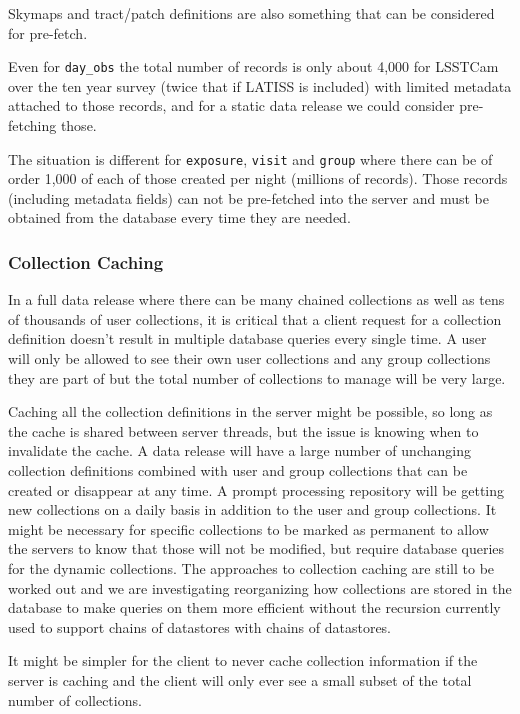 Skymaps and tract/patch definitions are also something that can be considered for pre-fetch.

Even for \texttt{day\_obs} the total number of records is only about 4,000 for LSSTCam over the ten year survey (twice that if LATISS is included) with limited metadata attached to those records, and for a static data release we could consider pre-fetching those.

The situation is different for \texttt{exposure}, \texttt{visit} and \texttt{group} where there can be of order 1,000 of each of those created per night (millions of records).
Those records (including metadata fields) can not be pre-fetched into the server and must be obtained from the database every time they are needed.

\subsubsection{Collection Caching}\label{collection-caching}

In a full data release where there can be many chained collections as well as tens of thousands of user collections, it is critical that a client request for a collection definition doesn't result in multiple database queries every single time.
A user will only be allowed to see their own user collections and any group collections they are part of but the total number of collections to manage will be very large.

Caching all the collection definitions in the server might be possible, so long as the cache is shared between server threads, but the issue is knowing when to invalidate the cache.
A data release will have a large number of unchanging collection definitions combined with user and group collections that can be created or disappear at any time.
A prompt processing repository will be getting new collections on a daily basis in addition to the user and group collections.
It might be necessary for specific collections to be marked as permanent to allow the servers to know that those will not be modified, but require database queries for the dynamic collections.
The approaches to collection caching are still to be worked out and we are investigating reorganizing how collections
are stored in the database to make queries on them more efficient without the recursion currently used to support chains of datastores with chains of datastores.

It might be simpler for the client to never cache collection information if the server is caching and the client will only ever see a small subset of the total number of collections.

